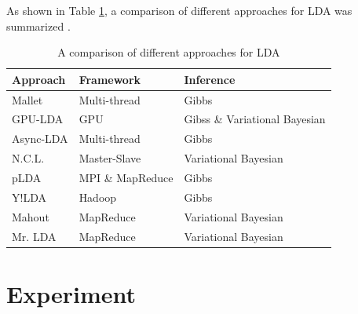 \documentclass[conference]{IEEEtran}
\begin{document}
As shown in Table \ref{lda_comp}, a comparison of different approaches for LDA was summarized \cite{zhai2012mr}.

\begin{table}[!t]
\caption{A comparison of different approaches for LDA}
\label{lda_comp}
\centering
\begin{tabular}{lll}\hline
Approach  & Framework        & Inference                     \\ \hline
Mallet \cite{mallet}   & Multi-thread     & Gibbs                         \\
GPU-LDA \cite{yan2009parallel}   & GPU              & Gibss \& Variational Bayesian \\
Async-LDA \cite{smyth2008asynchronous} & Multi-thread     & Gibbs                         \\
N.C.L. \cite{mariote2007parallelized}   & Master-Slave     & Variational Bayesian          \\
pLDA \cite{wang2009plda}     & MPI \& MapReduce & Gibbs                         \\
Y!LDA \cite{smola2010architecture}    & Hadoop           & Gibbs                         \\
Mahout \cite{mahout_lda}   & MapReduce        & Variational Bayesian          \\
Mr. LDA \cite{zhai2012mr}   & MapReduce        & Variational Bayesian         \\\hline
\end{tabular}
\end{table}

\section{Experiment}
\end{document}
